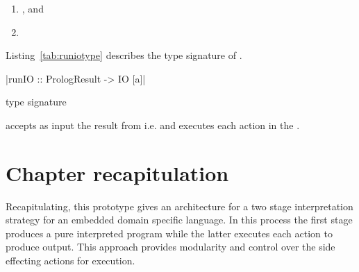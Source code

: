 \documentclass[thesis-solanki.tex]{subfiles}
\begin{document}
\begin{enumerate}
\item {}, and

\item {} 
\end{enumerate} 
 

Listing~\ref{tab:runiotype} describes the type signature of .
\begin{code-list}[H]
\begin{singlespace}
|runIO :: PrologResult -> IO [a]| 
\end{singlespace}
\caption{ type signature}
\label{tab:runiotype}
\end{code-list}

 accepts as input the result from  i.e.  and executes
each action in the .

\section{Chapter recapitulation}
Recapitulating, this prototype gives an architecture for a two stage interpretation strategy for an embedded domain specific language. In 
this process the first stage produces a pure interpreted program while the latter executes each action to produce output. This approach 
provides modularity and control over the side effecting actions for execution.   


\ifMain\ifDraft
\begin{scope}
  \nolinenumbers
  \enotesize
  \par
  \begin{singlespace}
  \setlength{\parskip}{12pt plus 2pt minus 1pt}
  \theendnotes
  \par
  \end{singlespace}
\end{scope}
\fi\fi
\end{document}
